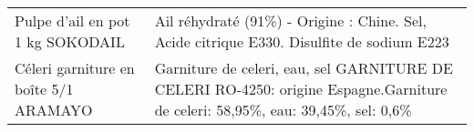 \begin{longtable}{p{5cm}p{10cm}}
                                                                         Pulpe d'ail en pot 1 kg SOKODAIL &                                                                                                                                                                                                                                                                                                                                                                                                                                                                                                                                                                                                                                                                                                                                                                                                                                                                                                                                                Ail réhydraté (91\%) - Origine : Chine. Sel, Acide citrique E330. Disulfite de sodium E223 \\
                                                                    Céleri garniture en boîte 5/1 ARAMAYO &                                                                                                                                                                                                                                                                                                                                                                                                                                                                                                                                                                                                                                                                                                                                                                                                                                                                                                          Garniture de celeri, eau, sel  GARNITURE DE CELERI RO-4250: origine Espagne.Garniture de celeri: 58,95\%, eau: 39,45\%, sel: 0,6\% \\

\end{longtable}
